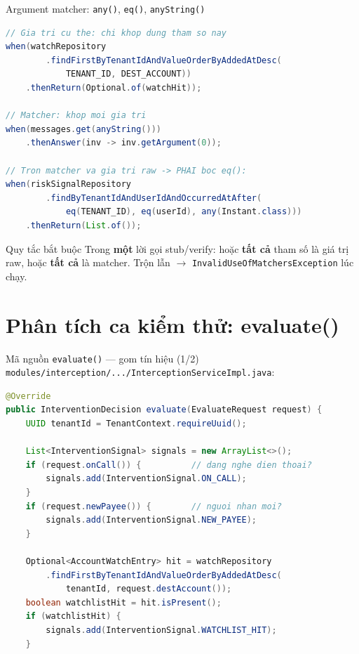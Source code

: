 \documentclass[aspectratio=169,12pt]{beamer}
\begin{document}
\begin{frame}[fragile]{Argument matcher: \texttt{any()}, \texttt{eq()}, \texttt{anyString()}}
\begin{lstlisting}[language=java,basicstyle=\ttfamily\scriptsize]
// Gia tri cu the: chi khop dung tham so nay
when(watchRepository
        .findFirstByTenantIdAndValueOrderByAddedAtDesc(
            TENANT_ID, DEST_ACCOUNT))
    .thenReturn(Optional.of(watchHit));

// Matcher: khop moi gia tri
when(messages.get(anyString()))
    .thenAnswer(inv -> inv.getArgument(0));

// Tron matcher va gia tri raw -> PHAI boc eq():
when(riskSignalRepository
        .findByTenantIdAndUserIdAndOccurredAtAfter(
            eq(TENANT_ID), eq(userId), any(Instant.class)))
    .thenReturn(List.of());
\end{lstlisting}

  \begin{alertblock}{Quy tắc bắt buộc}
    Trong \textbf{một} lời gọi stub/verify: hoặc \textbf{tất cả} tham số là
    giá trị raw, hoặc \textbf{tất cả} là matcher. Trộn lẫn $\to$
    \texttt{InvalidUseOfMatchersException} lúc chạy.
  \end{alertblock}
\end{frame}

\section{Phân tích ca kiểm thử: evaluate()}

\begin{frame}[fragile]{Mã nguồn \texttt{evaluate()} --- gom tín hiệu (1/2)}
  \texttt{modules/interception/.../InterceptionServiceImpl.java}:
\begin{lstlisting}[language=java,basicstyle=\ttfamily\scriptsize]
@Override
public InterventionDecision evaluate(EvaluateRequest request) {
    UUID tenantId = TenantContext.requireUuid();

    List<InterventionSignal> signals = new ArrayList<>();
    if (request.onCall()) {          // dang nghe dien thoai?
        signals.add(InterventionSignal.ON_CALL);
    }
    if (request.newPayee()) {        // nguoi nhan moi?
        signals.add(InterventionSignal.NEW_PAYEE);
    }

    Optional<AccountWatchEntry> hit = watchRepository
        .findFirstByTenantIdAndValueOrderByAddedAtDesc(
            tenantId, request.destAccount());
    boolean watchlistHit = hit.isPresent();
    if (watchlistHit) {
        signals.add(InterventionSignal.WATCHLIST_HIT);
    }
\end{lstlisting}
\end{frame}
\end{document}
